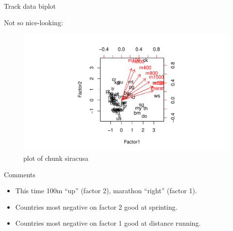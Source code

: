 \documentclass[ignorenonframetext,]{beamer}
\newenvironment{Shaded}{\begin{snugshade}}{\end{snugshade}}
\newcommand{\DataTypeTok}[1]{\textcolor[rgb]{0.13,0.29,0.53}{#1}}
\newcommand{\KeywordTok}[1]{\textcolor[rgb]{0.13,0.29,0.53}{\textbf{#1}}}
\newcommand{\NormalTok}[1]{#1}
\newcommand{\OperatorTok}[1]{\textcolor[rgb]{0.81,0.36,0.00}{\textbf{#1}}}
\begin{document}
\begin{frame}[fragile]{Track data biplot}
\protect\hypertarget{track-data-biplot}{}

Not so nice-looking:

\begin{Shaded}
\end{Shaded}

\begin{figure}
\centering
\includegraphics{figure/siracusa-1.pdf}
\caption{plot of chunk siracusa}
\end{figure}

\end{frame}

\begin{frame}{Comments}
\protect\hypertarget{comments-27}{}

\begin{itemize}
\item
  This time 100m ``up'' (factor 2), marathon ``right'' (factor 1).
\item
  Countries most negative on factor 2 good at sprinting.
\item
  Countries most negative on factor 1 good at distance running.
\end{itemize}

\end{frame}
\end{document}
